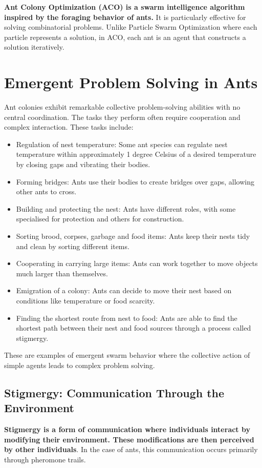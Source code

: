 \textbf{Ant Colony Optimization (ACO) is a swarm intelligence algorithm inspired by the foraging behavior of ants.} It is particularly effective for solving combinatorial problems.  Unlike Particle Swarm Optimization where each particle represents a solution, in ACO, each ant is an agent that constructs a solution iteratively.

\section{Emergent Problem Solving in Ants}
Ant colonies exhibit remarkable collective problem-solving abilities with no central coordination. The tasks they perform often require cooperation and complex interaction. These tasks include:
\begin{itemize}
    \item Regulation of nest temperature: Some ant species can regulate nest temperature within approximately 1 degree Celsius of a desired temperature by closing gaps and vibrating their bodies.
    \item Forming bridges: Ants use their bodies to create bridges over gaps, allowing other ants to cross.
    \item Building and protecting the nest: Ants have different roles, with some specialised for protection and others for construction.
    \item Sorting brood, corpses, garbage and food items: Ants keep their nests tidy and clean by sorting different items.
    \item Cooperating in carrying large items: Ants can work together to move objects much larger than themselves.
    \item Emigration of a colony: Ants can decide to move their nest based on conditions like temperature or food scarcity.
    \item Finding the shortest route from nest to food: Ants are able to find the shortest path between their nest and food sources through a process called stigmergy.
\end{itemize}
These are examples of emergent swarm behavior where the collective action of simple agents leads to complex problem solving.
\subsection*{Stigmergy: Communication Through the Environment}
\textbf{Stigmergy is a form of communication where individuals interact by modifying their environment.  These modifications are then perceived by other individuals}. In the case of ants, this communication occurs primarily through pheromone trails.

